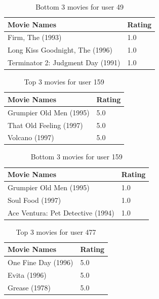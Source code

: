 \documentclass[12pt]{article}
\begin{document}
\begin{table}[ht]
\centering
\caption{Bottom 3 movies for user 49}
\label{tb2}
\begin{tabular}{|l|l|}
\hline
\textbf{Movie Names} & \textbf{Rating} \\ \hline \hline
Firm, The (1993) & 1.0   \\ \hline
Long Kiss Goodnight, The (1996) & 1.0   \\ \hline
Terminator 2: Judgment Day (1991) & 1.0  \\ \hline
\end{tabular}
\end{table}

\begin{table}[ht]
\centering
\caption{Top 3 movies for user 159}
\label{tb3}
\begin{tabular}{|l|l|}
\hline
\textbf{Movie Names} & \textbf{Rating} \\ \hline \hline
Grumpier Old Men (1995) & 5.0   \\ \hline
That Old Feeling (1997) & 5.0   \\ \hline
Volcano (1997) & 5.0  \\ \hline
\end{tabular}
\end{table}

\begin{table}[ht]
\centering
\caption{Bottom 3 movies for user 159}
\label{tb4}
\begin{tabular}{|l|l|}
\hline
\textbf{Movie Names} & \textbf{Rating} \\ \hline \hline
Grumpier Old Men (1995) & 1.0   \\ \hline
Soul Food (1997) & 1.0   \\ \hline
Ace Ventura: Pet Detective (1994) & 1.0  \\ \hline
\end{tabular}
\end{table}

\begin{table}[ht]
\centering
\caption{Top 3 movies for user 477}
\label{tb5}
\begin{tabular}{|l|l|}
\hline
\textbf{Movie Names} & \textbf{Rating} \\ \hline \hline
One Fine Day (1996) & 5.0   \\ \hline
Evita (1996) & 5.0   \\ \hline
Grease (1978) & 5.0  \\ \hline
\end{tabular}
\end{table}
\end{document}
